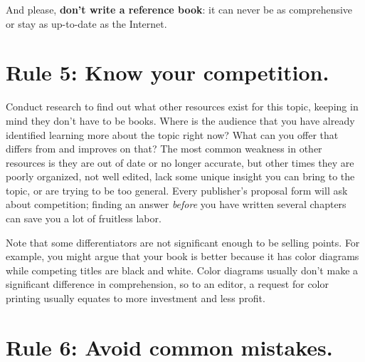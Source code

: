 \documentclass[10pt,letterpaper]{article}
\begin{document}
And please, \textbf{don't write a reference book}: it can never be as
comprehensive or stay as up-to-date as the Internet.

\section*{Rule 5: Know your competition.}

Conduct research to find out what other resources exist for this
topic, keeping in mind they don't have to be books.  Where is the
audience that you have already identified learning more about the
topic right now?  What can you offer that differs from and improves on
that?  The most common weakness in other resources is they are out of
date or no longer accurate, but other times they are poorly organized,
not well edited, lack some unique insight you can bring to the topic,
or are trying to be too general.  Every publisher's proposal form will
ask about competition; finding an answer \emph{before} you have
written several chapters can save you a lot of fruitless labor.

Note that some differentiators are not significant enough to be
selling points.  For example, you might argue that your book is better
because it has color diagrams while competing titles are black and
white.  Color diagrams usually don't make a significant difference in
comprehension, so to an editor, a request for color printing usually
equates to more investment and less profit.

\section*{Rule 6: Avoid common mistakes.}
\end{document}
